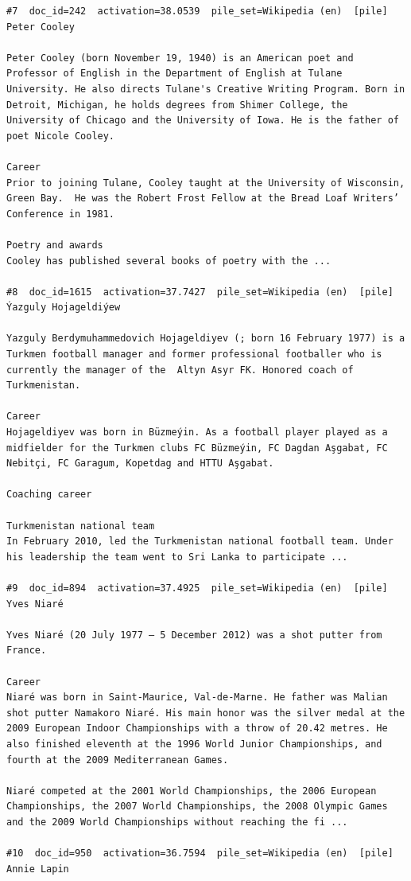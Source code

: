 \begin{verbatim}
#7  doc_id=242  activation=38.0539  pile_set=Wikipedia (en)  [pile]
Peter Cooley

Peter Cooley (born November 19, 1940) is an American poet and Professor of English in the Department of English at Tulane University. He also directs Tulane's Creative Writing Program. Born in Detroit, Michigan, he holds degrees from Shimer College, the University of Chicago and the University of Iowa. He is the father of poet Nicole Cooley.

Career
Prior to joining Tulane, Cooley taught at the University of Wisconsin, Green Bay.  He was the Robert Frost Fellow at the Bread Loaf Writers’ Conference in 1981.

Poetry and awards
Cooley has published several books of poetry with the ...

#8  doc_id=1615  activation=37.7427  pile_set=Wikipedia (en)  [pile]
Ýazguly Hojageldiýew

Yazguly Berdymuhammedovich Hojageldiyev (; born 16 February 1977) is a Turkmen football manager and former professional footballer who is currently the manager of the  Altyn Asyr FK. Honored coach of Turkmenistan.

Career 
Hojageldiyev was born in Büzmeýin. As a football player played as a midfielder for the Turkmen clubs FC Büzmeýin, FC Dagdan Aşgabat, FC Nebitçi, FC Garagum, Kopetdag and HTTU Aşgabat.

Coaching career

Turkmenistan national team 
In February 2010, led the Turkmenistan national football team. Under his leadership the team went to Sri Lanka to participate ...

#9  doc_id=894  activation=37.4925  pile_set=Wikipedia (en)  [pile]
Yves Niaré

Yves Niaré (20 July 1977 – 5 December 2012) was a shot putter from France.

Career
Niaré was born in Saint-Maurice, Val-de-Marne. He father was Malian shot putter Namakoro Niaré. His main honor was the silver medal at the 2009 European Indoor Championships with a throw of 20.42 metres. He also finished eleventh at the 1996 World Junior Championships, and fourth at the 2009 Mediterranean Games.

Niaré competed at the 2001 World Championships, the 2006 European Championships, the 2007 World Championships, the 2008 Olympic Games and the 2009 World Championships without reaching the fi ...

#10  doc_id=950  activation=36.7594  pile_set=Wikipedia (en)  [pile]
Annie Lapin


\end{verbatim}
